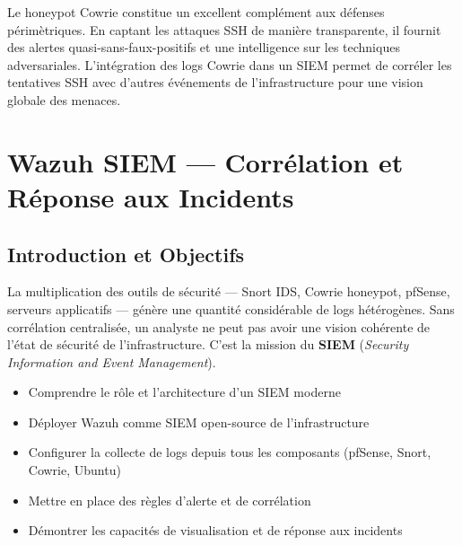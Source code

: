 \documentclass[12pt,a4paper,openany]{report}
\begin{document}
\begin{tcolorbox}[colback=primary!5!white, colframe=primary, title=\textbf{Bilan du Chapitre 7}]
Le honeypot Cowrie constitue un excellent complément aux défenses périmètriques. En captant les
attaques SSH de manière transparente, il fournit des alertes quasi-sans-faux-positifs et une
intelligence sur les techniques adversariales. L'intégration des logs Cowrie dans un SIEM permet
de corréler les tentatives SSH avec d'autres événements de l'infrastructure pour une vision
globale des menaces.
\end{tcolorbox}

\chapter{Wazuh SIEM --- Corrélation et Réponse aux Incidents}
\label{chap:wazuh}

\section{Introduction et Objectifs}

La multiplication des outils de sécurité --- Snort IDS, Cowrie honeypot, pfSense, serveurs
applicatifs --- génère une quantité considérable de logs hétérogènes. Sans corrélation centralisée,
un analyste ne peut pas avoir une vision cohérente de l'état de sécurité de l'infrastructure.
C'est la mission du \textbf{SIEM} (\textit{Security Information and Event Management}).

\begin{tcolorbox}[colback=primary!5!white, colframe=primary, title=\textbf{Objectifs de ce Chapitre}]
\begin{itemize}
    \item Comprendre le rôle et l'architecture d'un SIEM moderne
    \item Déployer Wazuh comme SIEM open-source de l'infrastructure
    \item Configurer la collecte de logs depuis tous les composants (pfSense, Snort, Cowrie, Ubuntu)
    \item Mettre en place des règles d'alerte et de corrélation
    \item Démontrer les capacités de visualisation et de réponse aux incidents
\end{itemize}
\end{tcolorbox}
\end{document}

